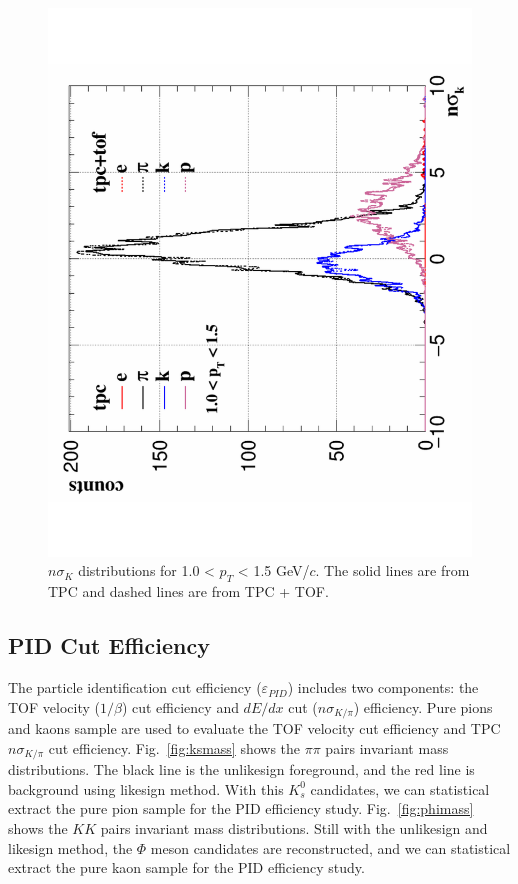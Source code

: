 \begin{figure}[htbp]
\begin{minipage}[htbp]{0.52\linewidth}
\includegraphics[width=1.0\textwidth,angle=-90]{figure/Run14_D0HFT/tofMatch_Hijing_nSigmaK2.pdf} 
\caption{$n\sigma_{K}$ distributions for 1.0 < $p_T$ < 1.5 GeV/$c$. The solid lines are from TPC and dashed lines are from TPC + TOF.\label{fig:tpck3}}
\end{minipage}
\end{figure}

\subsection{PID Cut Efficiency}
\label{pideff}
The particle identification cut efficiency ($\varepsilon_{PID}$) includes two components: the TOF velocity ($1/\beta$) cut efficiency and $dE/dx$ cut ($n\sigma_{K/\pi}$) efficiency. Pure pions and kaons sample are used to evaluate the TOF velocity cut efficiency and TPC $n\sigma_{K/\pi}$ cut efficiency. Fig.~\ref{fig:ksmass} shows the $\pi\pi$ pairs invariant mass distributions. The black line is the unlikesign foreground, and the red line is background using likesign method. With this $K_{s}^{0}$ candidates, we can statistical extract the pure pion sample for the PID efficiency study. Fig.~\ref{fig:phimass} shows the $KK$ pairs invariant mass distributions. Still with the unlikesign and likesign method, the $\Phi$ meson candidates are reconstructed, and we can statistical extract the pure kaon sample for the PID efficiency study.

